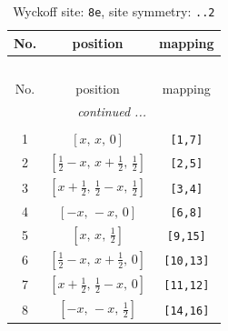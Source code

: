 \documentclass[fleqn,8pt]{jsarticle}
\begin{document}
\renewcommand{\arraystretch}{1.2}
\begin{longtable}{ccc}
\caption{Wyckoff site: {\tt 8e}, site symmetry: {\tt ..2}}
 \\
 \hline \hline
No. & position & mapping \\ \hline \endfirsthead

\multicolumn{2}{l}{\tablename\ \thetable{}} \\
 \hline \hline
No. & position & mapping \\ \hline \endhead

 \hline \hline
\multicolumn{2}{r}{\footnotesize\it continued ...} \\ \endfoot

 \hline \hline
\multicolumn{2}{r}{} \\ \endlastfoot

1 & $\left[ x,\, x,\, 0 \right]$ & {\tt [1,7]} \\ \hline
2 & $\left[ \frac{1}{2} - x,\, x + \frac{1}{2},\, \frac{1}{2} \right]$ & {\tt [2,5]} \\ \hline
3 & $\left[ x + \frac{1}{2},\, \frac{1}{2} - x,\, \frac{1}{2} \right]$ & {\tt [3,4]} \\ \hline
4 & $\left[ - x,\, - x,\, 0 \right]$ & {\tt [6,8]} \\ \hline
5 & $\left[ x,\, x,\, \frac{1}{2} \right]$ & {\tt [9,15]} \\ \hline
6 & $\left[ \frac{1}{2} - x,\, x + \frac{1}{2},\, 0 \right]$ & {\tt [10,13]} \\ \hline
7 & $\left[ x + \frac{1}{2},\, \frac{1}{2} - x,\, 0 \right]$ & {\tt [11,12]} \\ \hline
8 & $\left[ - x,\, - x,\, \frac{1}{2} \right]$ & {\tt [14,16]} \\
\end{longtable}
\renewcommand{\arraystretch}{1.2}
\end{document}
